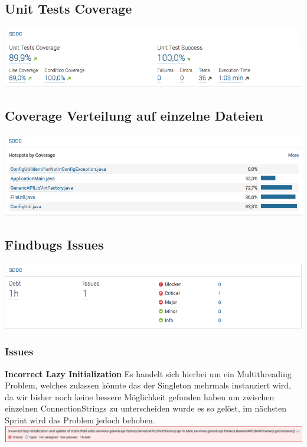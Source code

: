 \documentclass[11pt]{scrartcl}
\begin{document}
\subsection{Unit Tests Coverage}
\includegraphics[width=\textwidth]{coverage}

\subsection{Coverage Verteilung auf einzelne Dateien}
\includegraphics[width=\textwidth]{coverageperfile}

\subsection{Findbugs Issues}
\includegraphics[width=\textwidth]{issues}
\subsubsection{Issues}
\textbf{Incorrect Lazy Initialization}
\newline
Es handelt sich hierbei um ein Multithreading Problem, welches zulassen könnte 
das der Singleton mehrmals instanziert wird, da wir bisher noch keine bessere 
Möglichkeit gefunden haben um zwischen einzelnen ConnectionStrings zu 
unterscheiden wurde es so gelöst, im nächsten Sprint wird das Problem jedoch behoben.
\newline
\includegraphics[width=\textwidth]{lazy}
\end{document}
